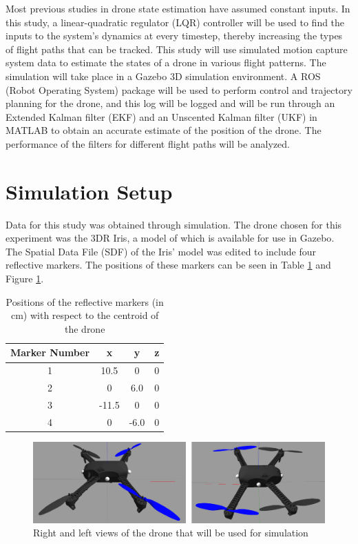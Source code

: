 \documentclass[letterpaper, preprint, paper,11pt]{AAS}	%
\begin{document}
Most previous studies in drone state estimation have assumed constant inputs. In this study, a linear-quadratic regulator (LQR) controller will be used to find the inputs to the system's dynamics at every timestep, thereby increasing the types of flight paths that can be tracked. This study will use simulated motion capture system data to estimate the states of a drone in various flight patterns. The simulation will take place in a Gazebo 3D simulation environment\cite{gazebo}. A ROS (Robot Operating System)\cite{ros} package will be used to perform control and trajectory planning for the drone, and this log will be logged and will be run through an Extended Kalman filter (EKF) and an Unscented Kalman filter (UKF) in MATLAB to obtain an accurate estimate of the position of the drone. The performance of the filters for different flight paths will be analyzed.


\section{Simulation Setup}

Data for this study was obtained through simulation. The drone chosen for this experiment was the 3DR Iris\cite{iris}, a model of which is available for use in Gazebo\cite{gazebo}. The Spatial Data File (SDF) of the Iris' model was edited to include four reflective markers. The positions of these markers can be seen in Table \ref{tab:DroneModel} and Figure \ref{fig:DroneModel}.

\begin{table}[htbp]
	\fontsize{10}{10}\selectfont
    \caption{Positions of the reflective markers (in cm) with respect to the centroid of the drone}
   \label{tab:DroneModel}
        \centering 
   \begin{tabular}{c | c | c | c} %
      \hline 
      Marker Number    & x & y & z \\
      \hline 
      1      & 10.5 & 0 & 0 \\
      2      & 0 & 6.0 & 0 \\
      3      & -11.5 & 0 & 0 \\
      4      & 0 & -6.0 & 0 \\
      \hline
   \end{tabular}
\end{table}

\begin{figure}[htb]
	\centering\includegraphics[width=5in]{Figures/DroneModel}
	\caption{Right and left views of the drone that will be used for simulation}
	\label{fig:DroneModel}
\end{figure}
\end{document}

